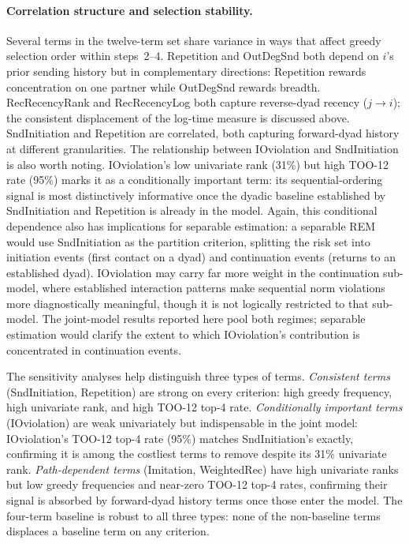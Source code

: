 \documentclass[11pt]{article}
\begin{document}
\paragraph{Correlation structure and selection stability.}
Several terms in the twelve-term set share variance in ways that affect greedy
selection order within steps~2--4. Repetition and OutDegSnd both depend on $i$'s
prior sending history but in complementary directions: Repetition rewards
concentration on one partner while OutDegSnd rewards breadth. RecRecencyRank and RecRecencyLog both capture reverse-dyad recency ($j \to i$);
the consistent displacement of the log-time measure is discussed above.
SndInitiation and Repetition are correlated, both capturing forward-dyad history
at different granularities. The relationship between IOviolation and SndInitiation is also worth noting.
IOviolation's low univariate rank (31\%) but high TOO-12 rate (95\%) marks it
as a conditionally important term: its sequential-ordering signal is most
distinctively informative once the dyadic baseline established by SndInitiation
and Repetition is already in the model. Again, this conditional dependence also has implications
for separable estimation: a separable REM would use SndInitiation as the
partition criterion, splitting the risk set into initiation events (first contact
on a dyad) and continuation events (returns to an established dyad). IOviolation
may carry far more weight in the continuation sub-model, where
established interaction patterns make sequential norm violations more
diagnostically meaningful, though it is not logically restricted to that
sub-model. The joint-model results reported here pool both regimes; separable
estimation would clarify the extent to which IOviolation's contribution is
concentrated in continuation events.


The sensitivity analyses help distinguish three types of terms.
\textit{Consistent terms} (SndInitiation, Repetition) are strong on every
criterion: high greedy frequency, high univariate rank, and high TOO-12 top-4 rate.
\textit{Conditionally important terms} (IOviolation) are weak univariately but
indispensable in the joint model: IOviolation's TOO-12 top-4 rate (95\%) matches
SndInitiation's exactly, confirming it is among the costliest terms to remove
despite its 31\% univariate rank.
\textit{Path-dependent terms} (Imitation, WeightedRec) have high univariate ranks
but low greedy frequencies and near-zero TOO-12 top-4 rates, confirming their
signal is absorbed by forward-dyad history terms once those enter the model.
The four-term baseline is robust to all three types: none of the non-baseline
terms displaces a baseline term on any criterion.
\end{document}
